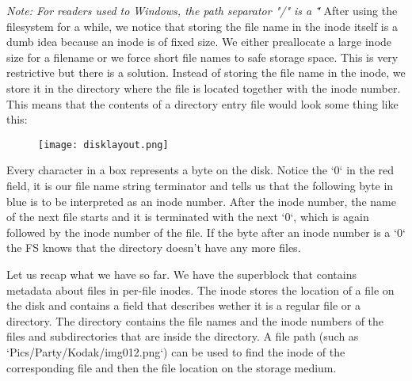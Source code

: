 \textit{Note: For readers used to Windows, the path separator "/" is a "\"}
After using the filesystem for a while, we notice that storing the file name in the inode itself is a
dumb idea because an inode is of fixed size. We either preallocate a large inode size for a filename
or we force short file names to safe storage space. This is very restrictive but there is a solution.
Instead of storing the file name in the inode, we store it in the directory where the file is located
together with the inode number. This means that the contents of a directory entry file would look some
thing like this:

\begin{figure}[h]
	\texttt{[image: disklayout.png]}
	\centering
\end{figure}

Every character in a box represents a byte on the disk. Notice the `0` in the red field,
it is our file name string terminator and tells us that the following byte in blue is to be interpreted
as an inode number. After the inode number, the name of the next file starts and it is terminated with the next `0`, which is again
followed by the inode number of the file. If the byte after an inode number is a `0` the FS knows
that the directory doesn't have any more files.

Let us recap what we have so far.
We have the superblock that contains metadata about files in per-file inodes. The inode stores the
location of a file on the disk and contains a field that describes wether it is a regular file or a
directory. The directory contains the file names and the inode numbers of the files and subdirectories
that are inside the directory. A file path (such as `Pics/Party/Kodak/img012.png`) can
be used to find the inode of the corresponding file and then the file location on the storage medium.

